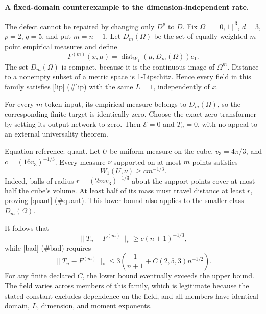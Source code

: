 \documentclass[10pt]{article}
\begin{document}
\paragraph*{A fixed-domain counterexample to the dimension-independent rate.}\mbox{}\par
The defect cannot be repaired by changing only \(D^p\) to \(D\). Fix \(\Omega=[0,1]^3\), \(d=3\), \(p=2\), \(q=5\), and put \(m=n+1\). Let \(D_m(\Omega)\) be the set of equally weighted \(m\)-point empirical measures and define \[F^{(m)}(x,\mu)=\operatorname{dist}_{W_1}(\mu,D_m(\Omega))e_1.\] The set \(D_m(\Omega)\) is compact, because it is the continuous image of \(\Omega^m\). Distance to a nonempty subset of a metric space is 1-Lipschitz. Hence every field in this family satisfies [lip] (\#lip) with the same \(L=1\), independently of \(x\).\par
For every \(m\)-token input, its empirical measure belongs to \(D_m(\Omega)\), so the corresponding finite target is identically zero. Choose the exact zero transformer by setting its output network to zero. Then \(\mathcal E=0\) and \(T_n=0\), with no appeal to an external universality theorem.\par
Equation reference: quant. Let \(U\) be uniform measure on the cube, \(v_3=4\pi/3\), and \(c=(16v_3)^{-1/3}\). Every measure \(\nu\) supported on at most \(m\) points satisfies \[
 W_1(U,\nu)\ge c m^{-1/3}.\] Indeed, balls of radius \(r=(2m v_3)^{-1/3}\) about the support points cover at most half the cube’s volume. At least half of its mass must travel distance at least \(r\), proving [quant] (\#quant). This lower bound also applies to the smaller class \(D_m(\Omega)\).\par
It follows that \[\|T_n-F^{(m)}\|_*\ge c(n+1)^{-1/3},\] while [bad] (\#bad) requires \[\|T_n-F^{(m)}\|_*\le
 3\left(\frac1{n+1}+C(2,5,3)n^{-1/2}\right).\] For any finite declared \(C\), the lower bound eventually exceeds the upper bound. The field varies across members of this family, which is legitimate because the stated constant excludes dependence on the field, and all members have identical domain, \(L\), dimension, and moment exponents.\par
\end{document}
